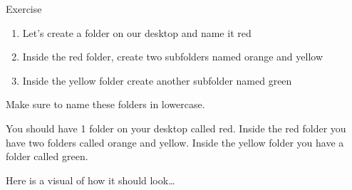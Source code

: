 \documentclass[8pt,ignorenonframetext,dvipsnames]{beamer}
\providecommand{\tightlist}{%
  \setlength{\itemsep}{0pt}\setlength{\parskip}{0pt}}
\let\olditem\item
\renewcommand{\item}{%
  \olditem\vspace{4pt}
}
\begin{document}
\begin{frame}{Exercise}

\begin{enumerate}
\def\labelenumi{\arabic{enumi}.}
\tightlist
\item
  Let's create a folder on our desktop and name it red\\
\item
  Inside the red folder, create two subfolders named orange and yellow\\
\item
  Inside the yellow folder create another subfolder named green
\end{enumerate}

Make sure to name these folders in lowercase.

You should have 1 folder on your desktop called red. Inside the red
folder you have two folders called orange and yellow. Inside the yellow
folder you have a folder called green.

Here is a visual of how it should look\ldots{}

\end{frame}
\end{document}
